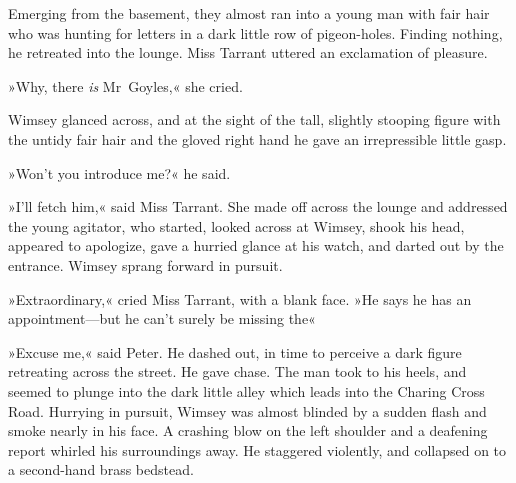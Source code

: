 Emerging from the basement, they almost ran into a young man with fair hair who was hunting for letters in a dark little row of pigeon-holes.  Finding nothing, he retreated into the lounge. Miss Tarrant uttered an exclamation of pleasure.

»Why, there \textit{is} Mr~Goyles,« she cried.

Wimsey glanced across, and at the sight of the tall, slightly stooping figure with the untidy fair hair and the gloved right hand he gave an irrepressible little gasp.

»Won't you introduce me?« he said.

»I'll fetch him,« said Miss Tarrant. She made off across the lounge and addressed the young agitator, who started, looked across at Wimsey, shook his head, appeared to apologize, gave a hurried glance at his watch, and darted out by the entrance. Wimsey sprang forward in pursuit.

»Extraordinary,« cried Miss Tarrant, with a blank face. »He says he has an appointment—but he can't surely be missing the\longdash«

»Excuse me,« said Peter. He dashed out, in time to perceive a dark figure retreating across the street. He gave chase. The man took to his heels, and seemed to plunge into the dark little alley which leads into the Charing Cross Road. Hurrying in pursuit, Wimsey was almost blinded by a sudden flash and smoke nearly in his face. A crashing blow on the left shoulder and a deafening report whirled his surroundings away. He staggered violently, and collapsed on to a second-hand brass bedstead.

